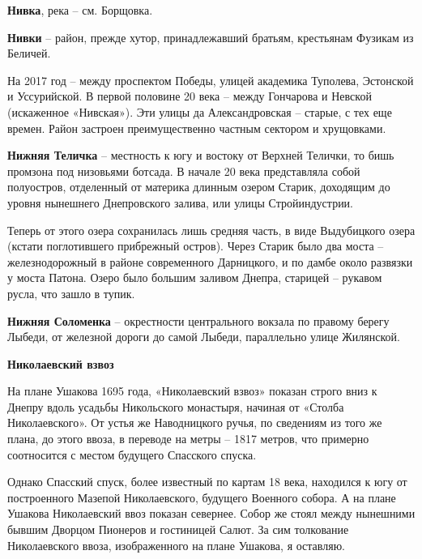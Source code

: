\medskip

\textbf{Нивка}, река – см. Борщовка.\\

\medskip

\textbf{Нивки} – район, прежде хутор, принадлежавший братьям, крестьянам Фузикам из Беличей. 

На 2017 год – между проспектом Победы, улицей академика Туполева, Эстонской и Уссурийской. В первой половине 20 века – между Гончарова и Невской (искаженное «Нивская»). Эти улицы да Александровская – старые, с тех еще времен. Район застроен преимущественно частным сектором и хрущовками.\\

\medskip

\textbf{Нижняя Теличка} – местность к югу и востоку от Верхней Телички, то бишь промзона под низовьями ботсада. В начале 20 века представляла собой полуостров, отделенный от материка длинным озером Старик, доходящим до уровня нынешнего Днепровского залива, или улицы Стройиндустрии. 

Теперь от этого озера сохранилась лишь средняя часть, в виде Выдубицкого озера (кстати поглотившего прибрежный остров). Через Старик было два моста – железнодорожный в районе современного Дарницкого, и по дамбе около развязки у моста Патона. Озеро было большим заливом Днепра, старицей – рукавом русла, что зашло в тупик.\\


\medskip

\textbf{Нижняя Соломенка} – окрестности центра\-льного вокзала по правому берегу Лыбеди, от железной дороги до самой Лыбеди, параллельно улице Жилянской.\\


\medskip

\textbf{Николаевский взвоз}

На плане Ушакова 1695 года, «Николаевский взвоз» показан строго вниз к Днепру вдоль усадьбы Никольского монастыря, начиная от «Столба Николаевского». От устья же Наводницкого ручья, по сведениям из того же плана, до этого ввоза, в переводе на метры – 1817 метров, что примерно соотносится с местом будущего Спасского спуска. 

Однако Спасский спуск, более известный по картам 18 века, находился к югу от построенного Мазепой Николаевского, будущего Военного собора. А на плане Ушакова Николаевский ввоз показан севернее. Собор же стоял между нынешними бывшим Дворцом Пионеров и гостиницей Салют. За сим толкование Николаевского ввоза, изображенного на плане Ушакова, я оставляю. \\


